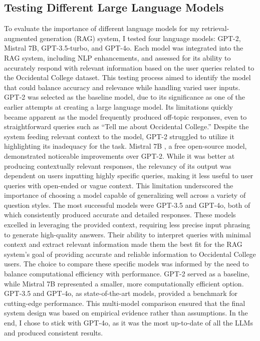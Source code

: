 \documentclass[10pt,twocolumn]{article}
\begin{document}
\subsection{Testing Different Large Language Models}
To evaluate the importance of different language models for my retrieval-augmented generation (RAG) system, I tested four language models: GPT-2, Mistral 7B, GPT-3.5-turbo, and GPT-4o. Each model was integrated into the RAG system, including NLP enhancements, and assessed for its ability to accurately respond with relevant information based on the user queries related to the Occidental College dataset. This testing process aimed to identify the model that could balance accuracy and relevance while handling varied user inputs.\newline
\indent GPT-2 was selected as the baseline model, due to its significance as one of the earlier attempts at creating a large language model\cite{radford2019gpt2}. Its limitations quickly became apparent as the model frequently produced off-topic responses, even to straightforward queries such as “Tell me about Occidental College.” Despite the system feeding relevant context to the model, GPT-2 struggled to utilize it highlighting its inadequacy for the task.\newline
\indent Mistral 7B \cite{jiang2023mistral7b}, a free open-source model, demonstrated noticeable improvements over GPT-2. While it was better at producing contextually relevant responses, the relevancy of its output was dependent on users inputting highly specific queries, making it less useful to user queries with open-ended or vague context. This limitation underscored the importance of choosing a model capable of generalizing well across a variety of question styles.\newline
\indent The most successful models were GPT-3.5 \cite{ye2023gpt3_analysis} and GPT-4o\cite{openai2024gpt4technicalreport}, both of which consistently produced accurate and detailed responses. These models excelled in leveraging the provided context, requiring less precise input phrasing to generate high-quality answers. Their ability to interpret queries with minimal context and extract relevant information made them the best fit for the RAG system’s goal of providing accurate and reliable information to Occidental College users.
The choice to compare these specific models was informed by the need to balance computational efficiency with performance. GPT-2 served as a baseline, while Mistral 7B represented a smaller, more computationally efficient option. GPT-3.5 and GPT-4o, as state-of-the-art models, provided a benchmark for cutting-edge performance. This multi-model comparison ensured that the final system design was based on empirical evidence rather than assumptions. In the end, I chose to stick with GPT-4o, as it was the most up-to-date of all the LLMs and produced consistent results.
\end{document}
